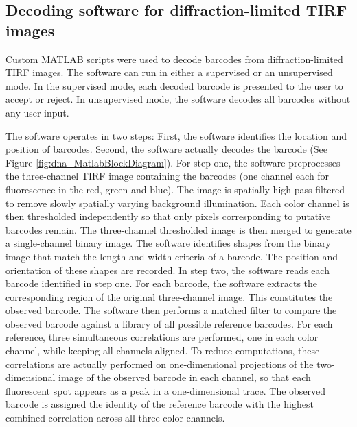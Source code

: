 \subsection{Decoding software for diffraction-limited TIRF images}\label{sec:dna_Methods:Matlab}
Custom MATLAB scripts were used to decode barcodes from diffraction-limited TIRF images. The software can run in either a supervised or an unsupervised mode. In the supervised mode, each decoded barcode is presented to the user to accept or reject. In unsupervised mode, the software decodes all barcodes without any user input.

The software operates in two steps: First, the software identifies the location and position of barcodes. Second, the software actually decodes the barcode (See Figure \ref{fig:dna_MatlabBlockDiagram}). For step one, the software preprocesses the three-channel TIRF image containing the barcodes (one channel each for fluorescence in the red, green and blue). The image is spatially high-pass filtered to remove slowly spatially varying background illumination. Each color channel is then thresholded independently so that only pixels corresponding to putative barcodes remain. The three-channel thresholded image is then merged to generate a single-channel binary image. The software identifies shapes from the binary image that match the length and width criteria of a barcode. The position and orientation of these shapes are recorded. In step two, the software reads each barcode identified in step one. For each barcode, the software extracts the corresponding region of the original three-channel image. This constitutes the observed barcode. The software then performs a matched filter to compare the observed barcode against a library of all possible reference barcodes. For each reference, three simultaneous correlations are performed, one in each color channel, while keeping all channels aligned. To reduce computations, these correlations are actually performed on one-dimensional projections of the two-dimensional image of the observed barcode in each channel, so that each fluorescent spot appears as a peak in a one-dimensional trace. The observed barcode is assigned the identity of the reference barcode with the highest combined correlation across all three color channels. 

